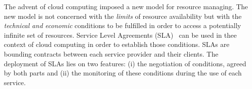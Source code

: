 


The advent of cloud computing imposed a new model for resource managing.
The new model is not concerned with the \textit{limits} of resource availability but with the \textit{technical and economic} conditions to be fulfilled in order to access a potentially infinite set of resources. 
Service Level Agreements (SLA)~\cite{SLA} can be used in thee context of cloud computing in order to establish those conditions.
SLAs are bounding contracts between each service provider and their clients.
The deployment of SLAs lies on two features: (i) the negotiation of conditions, agreed by both parts and (ii) the monitoring of these conditions during the use of each service.



